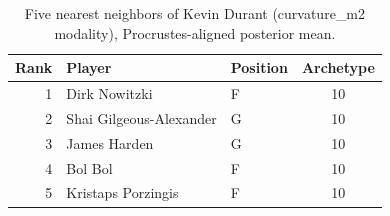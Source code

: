 \begin{table}[htbp]
  \centering\small
  \begin{tabular}{rllc}
    \toprule
    Rank & Player & Position & Archetype \\
    \midrule
    1 & Dirk Nowitzki & F & 10 \\
    2 & Shai Gilgeous-Alexander & G & 10 \\
    3 & James Harden & G & 10 \\
    4 & Bol Bol & F & 10 \\
    5 & Kristaps Porzingis & F & 10 \\
    \bottomrule
  \end{tabular}
  \caption{Five nearest neighbors of Kevin Durant (curvature_m2 modality), Procrustes-aligned posterior mean.}
  \label{tab:Kevin_Durant_neighbors_curvature_m2}
\end{table}

